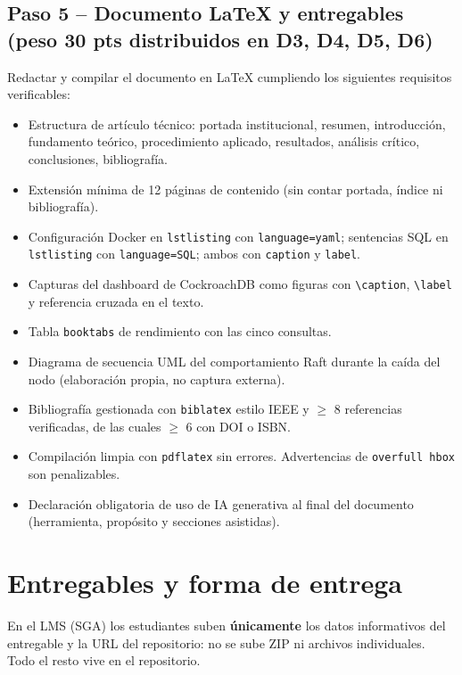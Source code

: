 \documentclass[11pt,a4paper]{article}
\begin{document}
\subsection*{Paso 5 -- Documento LaTeX y entregables (peso 30 pts distribuidos en D3, D4, D5, D6)}

Redactar y compilar el documento en LaTeX cumpliendo los siguientes requisitos verificables:

\begin{itemize}[nosep,leftmargin=1.6em]
    \item Estructura de art\'iculo t\'ecnico: portada institucional, resumen, introducci\'on, fundamento te\'orico, procedimiento aplicado, resultados, an\'alisis cr\'itico, conclusiones, bibliograf\'ia.
    \item Extensi\'on m\'inima de 12 p\'aginas de contenido (sin contar portada, \'indice ni bibliograf\'ia).
    \item Configuraci\'on Docker en \texttt{lstlisting} con \texttt{language=yaml}; sentencias SQL en \texttt{lstlisting} con \texttt{language=SQL}; ambos con \texttt{caption} y \texttt{label}.
    \item Capturas del dashboard de CockroachDB como figuras con \texttt{\textbackslash caption}, \texttt{\textbackslash label} y referencia cruzada en el texto.
    \item Tabla \texttt{booktabs} de rendimiento con las cinco consultas.
    \item Diagrama de secuencia UML del comportamiento Raft durante la ca\'ida del nodo (elaboraci\'on propia, no captura externa).
    \item Bibliograf\'ia gestionada con \texttt{biblatex} estilo IEEE y $\geq$ 8 referencias verificadas, de las cuales $\geq$ 6 con DOI o ISBN.
    \item Compilaci\'on limpia con \texttt{pdflatex} sin errores. Advertencias de \texttt{overfull hbox} son penalizables.
    \item Declaraci\'on obligatoria de uso de IA generativa al final del documento (herramienta, prop\'osito y secciones asistidas).
\end{itemize}

\section{Entregables y forma de entrega}

En el LMS (SGA) los estudiantes suben \textbf{\'unicamente} los datos informativos del entregable y la URL del repositorio: no se sube ZIP ni archivos individuales. Todo el resto vive en el repositorio.
\end{document}
